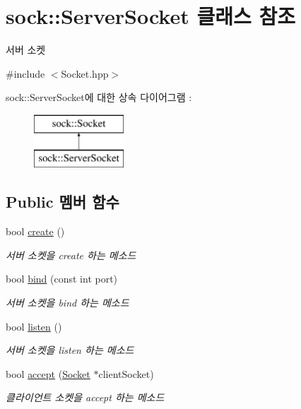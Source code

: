 \hypertarget{classsock_1_1_server_socket}{}\section{sock\+:\+:Server\+Socket 클래스 참조}
\label{classsock_1_1_server_socket}


서버 소켓  




{\ttfamily \#include $<$Socket.\+hpp$>$}

sock\+:\+:Server\+Socket에 대한 상속 다이어그램 \+: \begin{figure}[H]
\begin{center}
\leavevmode
\includegraphics[height=2.000000cm]{classsock_1_1_server_socket}
\end{center}
\end{figure}
\subsection*{Public 멤버 함수}
\begin{DoxyCompactItemize}
\item 
bool \hyperlink{classsock_1_1_server_socket_acaf072e165087c2a2cba2d1f078d8750}{create} ()
\begin{DoxyCompactList}\small\item\em 서버 소켓을 create 하는 메소드 \end{DoxyCompactList}\item 
bool \hyperlink{classsock_1_1_server_socket_a70e23f56e41228cbf43afe7702519f45}{bind} (const int port)
\begin{DoxyCompactList}\small\item\em 서버 소켓을 bind 하는 메소드 \end{DoxyCompactList}\item 
bool \hyperlink{classsock_1_1_server_socket_a3b3431968400296b8b7f9a73dd7c27bc}{listen} ()
\begin{DoxyCompactList}\small\item\em 서버 소켓을 listen 하는 메소드 \end{DoxyCompactList}\item 
bool \hyperlink{classsock_1_1_server_socket_add433570d6d808d667e2f2b5c24a5dd1}{accept} (\hyperlink{classsock_1_1_socket}{Socket} $\ast$client\+Socket)
\begin{DoxyCompactList}\small\item\em 클라이언트 소켓을 accept 하는 메소드 \end{DoxyCompactList}\end{DoxyCompactItemize}
